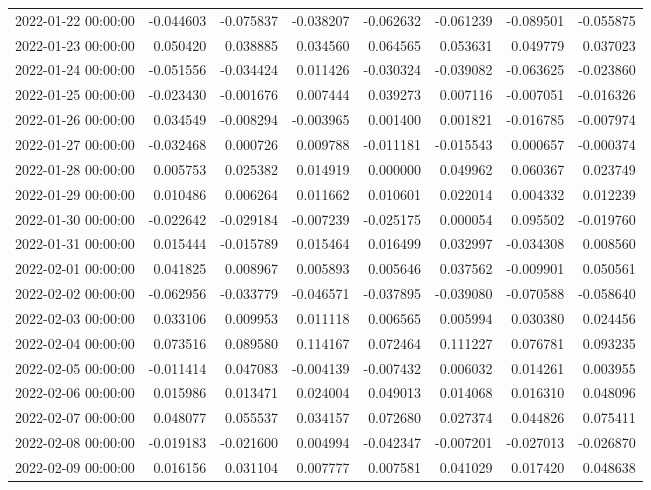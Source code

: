 \begin{tabular}{lrrrrrrr}
2022-01-22 00:00:00 & -0.044603 & -0.075837 & -0.038207 & -0.062632 & -0.061239 & -0.089501 & -0.055875 \\
2022-01-23 00:00:00 & 0.050420 & 0.038885 & 0.034560 & 0.064565 & 0.053631 & 0.049779 & 0.037023 \\
2022-01-24 00:00:00 & -0.051556 & -0.034424 & 0.011426 & -0.030324 & -0.039082 & -0.063625 & -0.023860 \\
2022-01-25 00:00:00 & -0.023430 & -0.001676 & 0.007444 & 0.039273 & 0.007116 & -0.007051 & -0.016326 \\
2022-01-26 00:00:00 & 0.034549 & -0.008294 & -0.003965 & 0.001400 & 0.001821 & -0.016785 & -0.007974 \\
2022-01-27 00:00:00 & -0.032468 & 0.000726 & 0.009788 & -0.011181 & -0.015543 & 0.000657 & -0.000374 \\
2022-01-28 00:00:00 & 0.005753 & 0.025382 & 0.014919 & 0.000000 & 0.049962 & 0.060367 & 0.023749 \\
2022-01-29 00:00:00 & 0.010486 & 0.006264 & 0.011662 & 0.010601 & 0.022014 & 0.004332 & 0.012239 \\
2022-01-30 00:00:00 & -0.022642 & -0.029184 & -0.007239 & -0.025175 & 0.000054 & 0.095502 & -0.019760 \\
2022-01-31 00:00:00 & 0.015444 & -0.015789 & 0.015464 & 0.016499 & 0.032997 & -0.034308 & 0.008560 \\
2022-02-01 00:00:00 & 0.041825 & 0.008967 & 0.005893 & 0.005646 & 0.037562 & -0.009901 & 0.050561 \\
2022-02-02 00:00:00 & -0.062956 & -0.033779 & -0.046571 & -0.037895 & -0.039080 & -0.070588 & -0.058640 \\
2022-02-03 00:00:00 & 0.033106 & 0.009953 & 0.011118 & 0.006565 & 0.005994 & 0.030380 & 0.024456 \\
2022-02-04 00:00:00 & 0.073516 & 0.089580 & 0.114167 & 0.072464 & 0.111227 & 0.076781 & 0.093235 \\
2022-02-05 00:00:00 & -0.011414 & 0.047083 & -0.004139 & -0.007432 & 0.006032 & 0.014261 & 0.003955 \\
2022-02-06 00:00:00 & 0.015986 & 0.013471 & 0.024004 & 0.049013 & 0.014068 & 0.016310 & 0.048096 \\
2022-02-07 00:00:00 & 0.048077 & 0.055537 & 0.034157 & 0.072680 & 0.027374 & 0.044826 & 0.075411 \\
2022-02-08 00:00:00 & -0.019183 & -0.021600 & 0.004994 & -0.042347 & -0.007201 & -0.027013 & -0.026870 \\
2022-02-09 00:00:00 & 0.016156 & 0.031104 & 0.007777 & 0.007581 & 0.041029 & 0.017420 & 0.048638 \\

\end{tabular}
